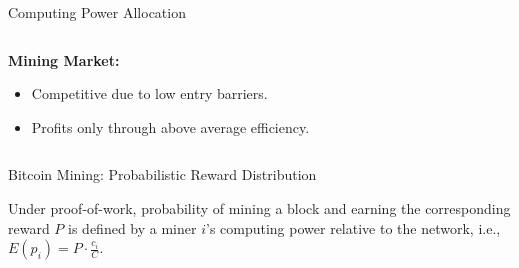 \documentclass[handout]{beamer}
\begin{document}
\begin{frame}{Computing Power Allocation}

\begin{columns}[T]
	\begin{column}{0.45\textwidth}
		\textbf{Mining Market:} \\
		\begin{itemize}
			\item Competitive due to low entry barriers.
			\item Profits only through above average efficiency.
		\end{itemize}		
		
		
		\vspace{1 em}
		
		\vspace{1 em}
	\end{column} %
	\begin{column}{0.55\textwidth}
		\begin{center}
		\begin{tikzpicture}[scale=1.0, every node/.style ={scale=1.0}]
			
		\end{tikzpicture}
		\end{center}
	\end{column}
\end{columns}

	
\end{frame}

\begin{frame}{Bitcoin Mining: Probabilistic Reward Distribution}

Under proof-of-work, probability of mining a block and earning the corresponding reward $P$ is defined by a miner $i$'s computing power relative to the network, i.e., $E(p_{i}) = P  \cdot \frac{c_{i}}{C}$.


\vspace{1.5 em}

\end{frame}
\end{document}
